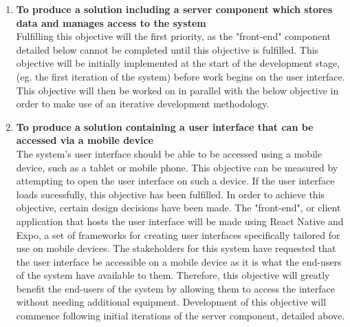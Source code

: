 \documentclass[../../../main.tex]{subfiles}
\begin{document}
\begin{enumerate}
  \item \textbf{To produce a solution including a server component which stores data and manages access to the system}\\
        Fulfilling this objective will the first priority, as the "front-end" component detailed below cannot be completed
        until this objective is fulfilled. This objective will be initially implemented at the start of the development
        stage, (eg. the first iteration of the system) before work begins on the user interface. This objective will then
        be worked on in parallel with the below objective in order to make use of an iterative development methodology.

  \item \textbf{To produce a solution containing a user interface that can be accessed via a mobile device}\\
        The system's user interface should be able to be accessed using a mobile device, such as a tablet
        or mobile phone. This objective can be measured by attempting to open the user interface on such a device.
        If the user interface loads sucessfully, this objective has been fulfilled. In order to achieve this objective,
        certain design decisions have been made. The "front-end", or client application that hosts the user interface
        will be made using React Native and Expo, a set of frameworks for creating user interfaces specifically
        tailored for use on mobile devices. The stakeholders for this system have requested that the user interface
        be accessible on a mobile device as it is what the end-users of the system have available to them.
        Therefore, this objective will greatly benefit the end-users of the system by allowing them to access the interface
        without needing additional equipment. Development of this objective will commence following initial
        iterations of the server component, detailed above.



\end{enumerate}
\end{document}
